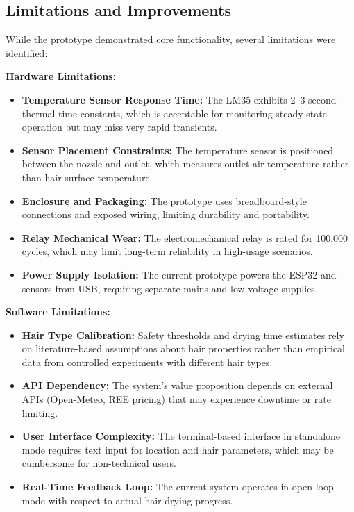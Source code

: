 \documentclass[11pt,a4paper]{article}
\begin{document}
\subsection{Limitations and Improvements}

While the prototype demonstrated core functionality, several limitations were identified:

\vspace{1\baselineskip}

\begin{minipage}[t]{0.5\textwidth}
\textbf{Hardware Limitations:}
\begin{itemize}[leftmargin=*,label=-]
\item \textbf{Temperature Sensor Response Time:} The LM35 exhibits 2--3 second thermal time constants, which is acceptable for monitoring steady-state operation but may miss very rapid transients.

\item \textbf{Sensor Placement Constraints:} The temperature sensor is positioned between the nozzle and outlet, which measures outlet air temperature rather than hair surface temperature.

\item \textbf{Enclosure and Packaging:} The prototype uses breadboard-style connections and exposed wiring, limiting durability and portability.

\item \textbf{Relay Mechanical Wear:} The electromechanical relay is rated for 100,000 cycles, which may limit long-term reliability in high-usage scenarios.

\item \textbf{Power Supply Isolation:} The current prototype powers the ESP32 and sensors from USB, requiring separate mains and low-voltage supplies.
\end{itemize}

\end{minipage}\hfill
\begin{minipage}[t]{0.4\textwidth}
\textbf{Software Limitations:}
\begin{itemize}[leftmargin=*,label=-]
\item \textbf{Hair Type Calibration:} Safety thresholds and drying time estimates rely on literature-based assumptions about hair properties rather than empirical data from controlled experiments with different hair types.

\item \textbf{API Dependency:} The system's value proposition depends on external APIs (Open-Meteo, REE pricing) that may experience downtime or rate limiting.

\item \textbf{User Interface Complexity:} The terminal-based interface in standalone mode requires text input for location and hair parameters, which may be cumbersome for non-technical users.

\item \textbf{Real-Time Feedback Loop:} The current system operates in open-loop mode with respect to actual hair drying progress.
\end{itemize}
\end{minipage}
\end{document}
